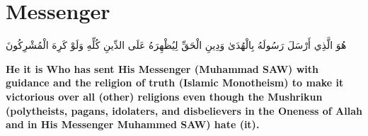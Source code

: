 \chapter{Messenger}
\begin{center}
    {\Huge    
        \begin{Arabic}
            هُوَ الَّذِي أَرْسَلَ رَسُولَهُ بِالْهُدَىٰ وَدِينِ الْحَقِّ لِيُظْهِرَهُ عَلَى الدِّينِ كُلِّهِ وَلَوْ كَرِهَ الْمُشْرِكُونَ
        \end{Arabic}
    }
\end{center}
\vspace*{\fill}
\vspace{3cm}
\begin{center}
    \large \textbf{He it is Who has sent His Messenger (Muhammad SAW) with guidance and the religion of truth (Islamic Monotheism) to make it victorious over all (other) religions even though the Mushrikun (polytheists, pagans, idolaters, and disbelievers in the Oneness of Allah and in His Messenger Muhammed SAW) hate (it).}
\end{center}
